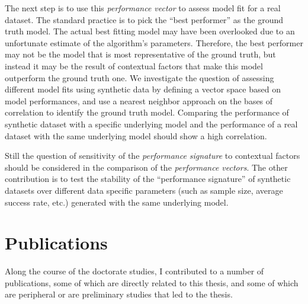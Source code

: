 The next step is to use this \textit{performance vector} to assess model fit for a real dataset. The standard practice is to pick the ``best performer'' as the ground truth model. The actual best fitting model may have been overlooked due to an unfortunate estimate of the algorithm's parameters. Therefore, the best performer may not be the model that is most representative of the ground truth, but instead it may be the result of contextual factors that make this model outperform the ground truth one. We investigate the question of assessing different model fits using synthetic data by defining a vector space based on model performances, and use a nearest neighbor approach on the bases of correlation to identify the ground truth model. Comparing the performance of synthetic dataset with a specific underlying model and the performance of a real dataset with the same underlying model should show a high correlation. 

Still the question of sensitivity of the \textit{performance signature} to contextual factors should be considered in the comparison of the \textit{performance vectors}. The other contribution is to test the stability of the ``performance signature'' of synthetic datasets over different data specific parameters (such as sample size, average success rate, etc.) generated with the same underlying model. 


\section{Publications}

Along the course of the doctorate studies, I contributed to a number of publications, some of which are directly related to this thesis, and some of which are peripheral or are preliminary studies that led to the thesis.

